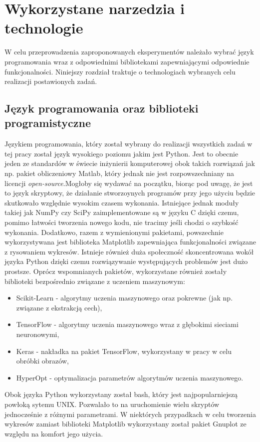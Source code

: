 \section{Wykorzystane narzedzia i technologie} \label{tools}
W celu przeprowadzenia zaproponowanych eksperymentów należało wybrać język programowania wraz z odpowiednimi bibliotekami zapewniającymi odpowiednie funkcjonalności. Niniejszy rozdział traktuje o technologiach wybranych celu realizacji postawionych zadań.
\subsection{Język programowania oraz biblioteki programistyczne}
Językiem programowania, który został wybrany do realizacji wszystkich zadań w tej pracy został język wysokiego poziomu jakim jest Python. Jest to obecnie jeden ze standardów w świecie inżynierii komputerowej obok takich rozwiązań jak np. pakiet obliczeniowy Matlab, który jednak nie jest rozpowszechniany na licencji \textit{open-source}.Mogłoby się wydawać na początku, biorąc pod uwagę, że jest to język skryptowy, że działanie stworzoynych programów przy jego użyciu będzie skutkowało względnie wysokim czasem wykonania. Istniejące jednak moduły takiej jak NumPy czy SciPy\cite{scipy} zaimplementowane są w języku C dzięki czemu, pomimo łatwości tworzenia nowego kodu, nie tracimy jeśli chodzi o szybkość wykonania. Dodatkowo, razem z wymienionymi pakietami, powszechnie wykorzystywana jest biblioteka Matplotlib\cite{matplotlib} zapewniająca funkcjonalności związane z rysowaniem wykresów. Istnieje również duża społeczność skoncentrowana wokół języka Python dzięki czemu rozwiązywanie występujących problemów jest dużo prostsze. Oprócz wspomnianych pakietów, wykorzystane również zostały biblioteki bezpośrednio związane z uczeniem maszynowym:
\begin{itemize}
\item Scikit-Learn\cite{scikit} - algorytmy uczenia maszynowego oraz pokrewne (jak np. związane z ekstrakcją cech),
\item TensorFlow\cite{tensorflow} - algorytmy uczenia maszynowego wraz z głębokimi sieciami neuronowymi,
\item Keras\cite{keras} - nakładka na pakiet TensorFlow, wykorzystany w pracy w celu obróbki obrazów,
\item HyperOpt\cite{hyperopt} - optymalizacja parametrów algorytmów uczenia maszynowego.
\end{itemize}
Obok języka Python wykorzystany został bash, który jest najpopularniejszą powłoką sytemu UNIX. Pozwalało to na uruchomienie wielu skryptów jednocześnie z różnymi parametrami. W niektórych przypadkach w celu tworzenia wykresów zamiast biblioteki Matplotlib wykorzystany został pakiet Gnuplot ze względu na komfort jego użycia.

